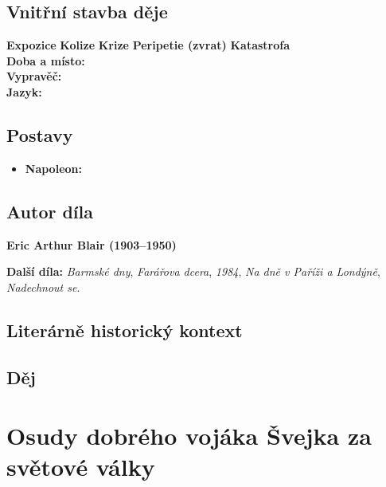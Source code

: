 \documentclass[12pt, a4paper]{article}
\newcommand{\mybf}[1]{\textcolor[RGB]{0, 179, 219}{\textbf{#1}}}
\begin{document}
\subsection*{Vnitřní stavba děje}
\noindent\textbf{Expozice} 
\noindent\textbf{Kolize} 
\noindent\textbf{Krize} 
\noindent\textbf{Peripetie (zvrat)} 
\noindent\textbf{Katastrofa} \\[10pt]
\mybf{Doba a místo:} \\[10pt]
\mybf{Vypravěč:} \\[10pt]
\mybf{Jazyk:} 

\subsection*{Postavy}
\begin{itemize}[itemsep=0.3em]
	\item \textbf{Napoleon:}
\end{itemize}

\subsection*{Autor díla}
\textbf{Eric Arthur Blair (1903--1950)}

\textbf{Další díla:} \textit{Barmské dny}, \textit{Farářova dcera}, \textit{1984}, \textit{Na dně v Paříži a Londýně}, \textit{Nadechnout se}.

\subsection*{Literárně historický kontext}

{\color{subsectioncolor}\hrulefill}
\subsection*{\color{subsectioncolor}Děj}

\newpage

\section{Osudy dobrého vojáka Švejka za světové války}
\end{document}

